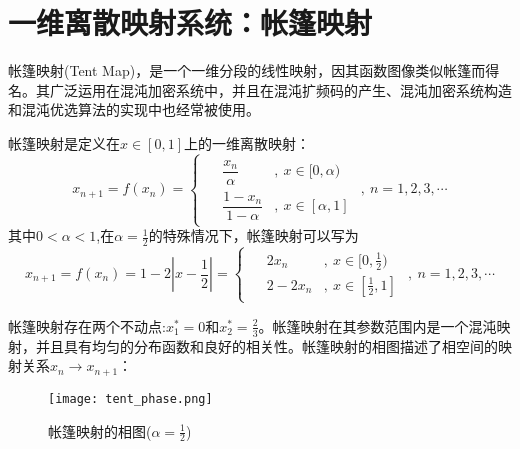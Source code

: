 \section{一维离散映射系统：帐篷映射}
帐篷映射(Tent Map)，是一个一维分段的线性映射，因其函数图像类似帐篷而得名。其广泛运用在混沌加密系统中，并且在混沌扩频码的产生、混沌加密系统构造和混沌优选算法的实现中也经常被使用。

帐篷映射是定义在$x\in [0,1]$上的一维离散映射：
\begin{equation}
    x_{n+1}=f(x_n)=
    \begin{cases}
        \begin{aligned}
            &\dfrac{x_n}{\alpha}&,\ x\in [0,\alpha)\\
            &\dfrac{1-x_n}{1-\alpha}&,\ x\in [\alpha,1]
        \end{aligned}
    \end{cases},\ n=1,2,3,\cdots
\end{equation}
其中$0<\alpha<1$,在$\alpha=\frac{1}{2}$的特殊情况下，帐篷映射可以写为
\begin{equation}
    x_{n+1}=f(x_n)=1-2|x-\frac{1}{2}|=
    \begin{cases}
        \begin{aligned}
            &2x_n&,\ x\in [0,\frac{1}{2})\\
            &2-2x_n&,\ x\in [\frac{1}{2},1]
        \end{aligned}
    \end{cases},\ n=1,2,3,\cdots
\end{equation}

帐篷映射存在两个不动点:$x_1^*=0$和$x_2^*=\frac{2}{3}$。帐篷映射在其参数范围内是一个混沌映射，并且具有均匀的分布函数和良好的相关性。帐篷映射的相图描述了相空间的映射关系$x_n\rightarrow x_{n+1}$：
\begin{figure}
	\centering
	\texttt{[image: tent\_phase.png]}
    \caption{帐篷映射的相图($\alpha=\frac{1}{2}$)}
    \label{fig:tent_pha}
\end{figure}